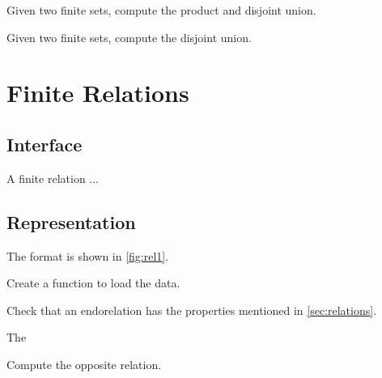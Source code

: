 \begin{exercise}
Given two finite sets, compute the product and disjoint union.

\end{exercise}
\begin{exercise}
Given two finite sets, compute the disjoint union.

\end{exercise}


\section{Finite Relations}

\subsection*{Interface}

A finite relation  ...


\subsection*{Representation}

The format is shown in \cref{fig:rel1}.


\begin{exercise}
Create a function to load the data.


%

\end{exercise}


%  

\begin{exercise}

Check that an endorelation has the properties mentioned in \cref{sec:relations}.

The

\end{exercise}




\begin{exercise}[Opposite]
Compute the opposite relation.


\end{exercise}

